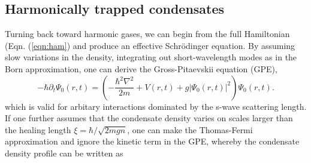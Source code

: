 

	
	
	
	\subsection*{Harmonically trapped condensates}

	Turning back toward harmonic gases, we can begin from the full Hamiltonian (Eqn.
	(\ref{eqn:ham}) and produce an effective Schr\"{o}dinger equation.
	By assuming slow variations in the density, integrating out short-wavelength modes as in the Born approximation, one can derive the Gross-Pitaevskii equation (GPE),
	\begin{equation}
		-\hbar\partial_t\Psi_0(r,t) = \left(-\frac{\hbar^2\nabla^2}{2m} + V(r,t) + g|\Psi_0(r,t)|^2\right)\Psi_0(r,t).
		\label{eqn:GPE}
	\end{equation}
	which is valid for arbitary interactions dominated by the s-wave scattering length.
	 If one further assumes that the condensate density varies on scales larger than the healing length $\xi = \hbar/\sqrt{2mgn}$, one can make the Thomas-Fermi approximation and ignore the kinetic term in the GPE, whereby the condensate density profile can be written as

